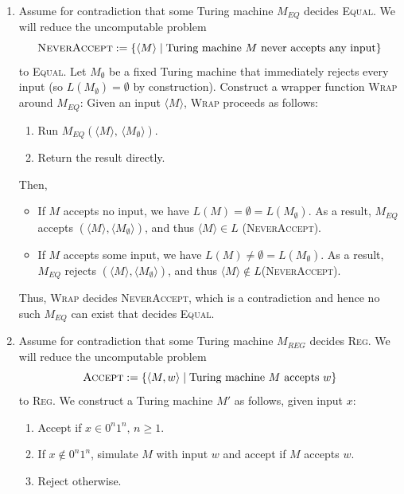 \documentclass[12pt]{article}
\begin{document}
\begin{solution}
    \bbni
    \begin{enumerate}
        \item Assume for contradiction that some Turing machine $M_{EQ}$ decides \textsc{Equal}. We will reduce the uncomputable problem
        \[
        \textsc{NeverAccept} := \left\{ \langle M \rangle \mid \text{Turing machine } M \text{ never accepts any input} \right\}
        \]
        to \textsc{Equal}. Let $M_\emptyset$ be a fixed Turing machine that immediately rejects every input (so $L(M_\emptyset) = \emptyset$ by construction). Construct a wrapper function \textsc{Wrap} around $M_{EQ}$: Given an input $\langle M \rangle$, \textsc{Wrap} proceeds as follows:
        \begin{enumerate}
            \item Run $M_{EQ}\!\left(\langle M \rangle,\, \langle M_\emptyset \rangle\right)$.
            \item Return the result directly.
        \end{enumerate}
        
        
        Then,

        \begin{itemize}
        \item If 
        $M$ accepts no input, we have $L(M) = \emptyset = L(M_\emptyset)$. As a result, $M_{EQ}$ accepts $\left(\langle M \rangle, \langle M_\emptyset \rangle\right)$, and thus $\langle M \rangle \in L$ (\textsc{NeverAccept}).

        \item If
        $M$ accepts some input, we have $L(M) \neq \emptyset = L(M_\emptyset)$. As a result, $M_{EQ}$ rejects $\left(\langle M \rangle, \langle M_\emptyset \rangle\right)$, and thus $\langle M \rangle \notin L$(\textsc{NeverAccept}).
        \end{itemize}

        Thus, \textsc{Wrap} decides \textsc{NeverAccept}, which is a contradiction and hence no such $M_{EQ}$ can exist that decides \textsc{Equal}.

        \item Assume for contradiction that some Turing machine $M_{REG}$ decides \textsc{Reg}. We will reduce the uncomputable problem
        \[
        \textsc{Accept} := \left\{ \langle M, w \rangle \mid \text{Turing machine } M \text{ accepts } w \right\}
        \]
        to \textsc{Reg}. We construct a Turing machine $M'$ as follows, given input $x$: 
        \begin{enumerate}
            \item Accept if $x \in 0^n1^n, \, n \geq 1$. 
            \item If $x \notin 0^n1^n$, simulate $M$ with input $w$ and accept if $M$ accepts $w$. 
            \item Reject otherwise.
        \end{enumerate}
        

\end{enumerate}
\end{solution}
\end{document}
